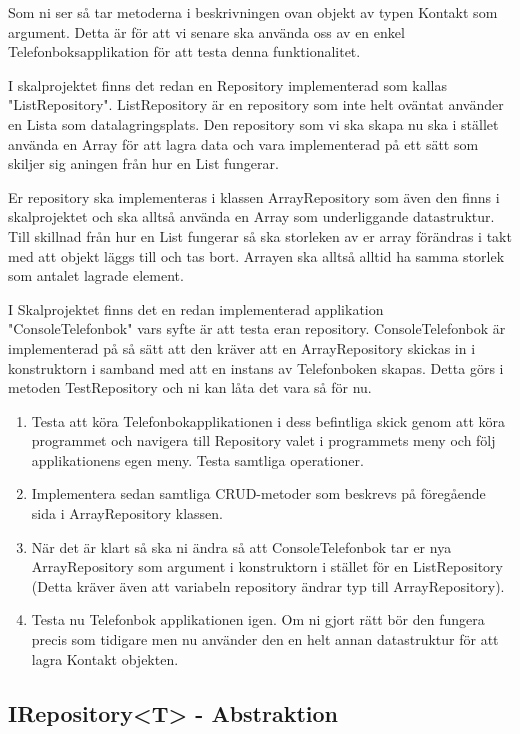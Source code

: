 \documentclass{article}
\begin{document}
  Som ni ser så tar metoderna i beskrivningen ovan objekt av typen Kontakt som argument. Detta är för att vi senare ska använda oss av en enkel Telefonboksapplikation för att testa denna funktionalitet.
  
  I skalprojektet finns det redan en Repository implementerad som kallas "ListRepository". ListRepository är en repository som inte helt oväntat använder en Lista som datalagringsplats. Den repository som vi ska skapa nu ska i stället använda en Array för att lagra data och vara implementerad på ett sätt som skiljer sig aningen från hur en List fungerar.
  
  Er repository ska implementeras i klassen ArrayRepository som även den finns i skalprojektet och ska alltså använda en Array som underliggande datastruktur. Till skillnad från hur en List fungerar så ska storleken av er array förändras i takt med att objekt läggs till och tas bort. Arrayen ska alltså alltid ha samma storlek som antalet lagrade element.

I Skalprojektet finns det en redan implementerad applikation "ConsoleTelefonbok" vars syfte är att testa eran repository. ConsoleTelefonbok är implementerad på så sätt att den kräver att en ArrayRepository skickas in i konstruktorn i samband med att en instans av Telefonboken skapas. Detta görs i metoden TestRepository och ni kan låta det vara så för nu.
    \begin{enumerate}
                 \item Testa att köra Telefonbokapplikationen i dess befintliga skick genom att köra programmet och navigera till Repository valet i programmets meny och följ applikationens egen meny. Testa samtliga operationer.
    	          \item Implementera sedan samtliga CRUD-metoder som beskrevs på föregående sida i ArrayRepository klassen.
    	          \item När det är klart så ska ni ändra så att ConsoleTelefonbok tar er nya ArrayRepository som argument i konstruktorn i stället för en ListRepository (Detta kräver även att variabeln repository ändrar typ till ArrayRepository).
    	          \item Testa nu Telefonbok applikationen igen. Om ni gjort rätt bör den fungera precis som tidigare men nu använder den en helt annan datastruktur för att lagra Kontakt objekten.
    	              
     \end{enumerate}

  \subsection*{IRepository<T> - Abstraktion}
\end{document}
